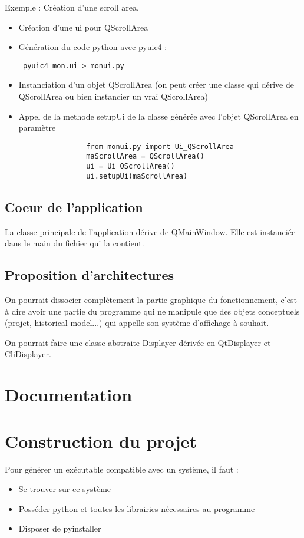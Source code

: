 \documentclass[12pt,a4paper]{article}
\begin{document}
        Exemple : Création d'une scroll area.
        \begin{itemize}
            \item Création d'une ui pour QScrollArea
            \item Génération du code python avec pyuic4 :\begin{verbatim} pyuic4 mon.ui > monui.py \end{verbatim}
            \item Instanciation d'un objet QScrollArea (on peut créer une classe qui dérive de QScrollArea ou bien instancier un vrai QScrollArea)
            \item Appel de la methode setupUi de la classe générée avec l'objet QScrollArea en paramètre
                \begin{verbatim}
                from monui.py import Ui_QScrollArea
                maScrollArea = QScrollArea()
                ui = Ui_QScrollArea()
                ui.setupUi(maScrollArea)
                \end{verbatim}
        \end{itemize}
    \subsection{Coeur de l'application}
        La classe principale de l'application dérive de QMainWindow. Elle est instanci\'ee dans le main du fichier qui la contient.


    \subsection{Proposition d'architectures}
        On pourrait dissocier complètement la partie graphique du fonctionnement, c'est à dire avoir une partie du programme
        qui ne manipule que des objets conceptuels (projet, historical model...) qui appelle son système d'affichage à souhait.

        On pourrait faire une classe abstraite Displayer dérivée en QtDisplayer et CliDisplayer.


\section{Documentation}

\section{Construction du projet}
    Pour générer un exécutable compatible avec un système, il faut : 
    \begin{itemize}
    \item Se trouver sur ce système
    \item Posséder python et toutes les librairies nécessaires au programme
    \item Disposer de pyinstaller
    \end{itemize}
    
\end{document}
